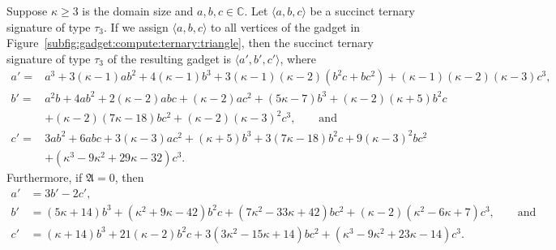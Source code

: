\documentclass[11pt]{article}
\begin{document}
\begin{lemma} \label{lem:compute:ternary:triangle}
 Suppose $\kappa \ge 3$ is the domain size and $a,b,c \in \mathbb{C}$.
 Let $\langle a,b,c \rangle$ be a succinct ternary signature of type $\tau_3$.
 If we assign $\langle a,b,c \rangle$ to all vertices of the gadget in Figure~\ref{subfig:gadget:compute:ternary:triangle},
 then the succinct ternary signature of type $\tau_3$ of the resulting gadget is $\langle a', b', c' \rangle$,
 where
 \begin{align*}
  a' = {}&  a^3
          + 3 (\kappa - 1) a b^2
          + 4 (\kappa - 1) b^3
          + 3 (\kappa - 1) (\kappa - 2) (b^2 c + b c^2)
          + (\kappa - 1) (\kappa - 2) (\kappa - 3) c^3,\\
  b' = {}&  a^2 b
          + 4 a b^2
          + 2 (\kappa - 2) a b c
          + (\kappa - 2) a c^2
          + (5 \kappa - 7) b^3
          + (\kappa - 2) (\kappa + 5) b^2 c\\
         &+ (\kappa - 2) (7 \kappa - 18) b c^2
          + (\kappa - 2) (\kappa - 3)^2 c^3,
         \qquad \text{and}\\
  c' = {}&  3 a b^2
          + 6 a b c
          + 3 (\kappa - 3) a c^2
          + (\kappa + 5) b^3
          + 3 (7 \kappa - 18) b^2 c
          + 9 (\kappa - 3)^2 b c^2\\
         &+ (\kappa^3 - 9 \kappa^2 + 29 \kappa - 32) c^3.
 \end{align*}
 Furthermore, if $\mathfrak{A} = 0$, then
 \begin{align*}
  a' &= 3 b' - 2 c',\\
  b' &=   (5 \kappa + 14) b^3
        + (\kappa^2 + 9 \kappa - 42) b^2 c
        + (7 \kappa^2 - 33 \kappa + 42) b c^2
        + (\kappa - 2) (\kappa^2 - 6 \kappa + 7) c^3,
        \qquad \text{and}\\
  c' &=   (\kappa + 14) b^3
        + 21 (\kappa - 2) b^2 c
        + 3 (3 \kappa^2 - 15 \kappa + 14) b c^2
        + (\kappa^3 - 9 \kappa^2 + 23 \kappa - 14) c^3.
 \end{align*}
\end{lemma}
\end{document}
